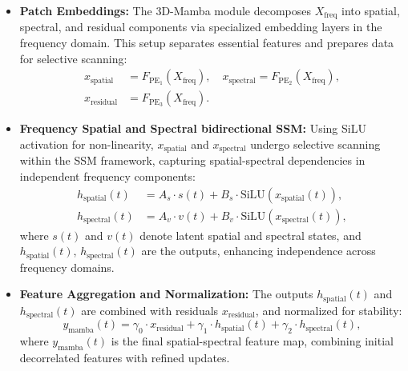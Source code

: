 \begin{itemize}
    \item \textbf{Patch Embeddings:} The 3D-Mamba module decomposes \( X_{\text{freq}} \) into spatial, spectral, and residual components via specialized embedding layers in the frequency domain. This setup separates essential features and prepares data for selective scanning:
    \begin{equation}
    \begin{aligned}
    x_{\text{spatial}} &= F_{\text{PE}_1}(X_{\text{freq}}), \quad x_{\text{spectral}} = F_{\text{PE}_2}(X_{\text{freq}}), \\
    x_{\text{residual}} &= F_{\text{PE}_3}(X_{\text{freq}}).
    \end{aligned}
    \end{equation}

    \item \textbf{Frequency Spatial and Spectral bidirectional SSM:} Using SiLU activation for non-linearity, \( x_{\text{spatial}} \) and \( x_{\text{spectral}} \) undergo selective scanning within the SSM framework, capturing spatial-spectral dependencies in independent frequency components:
        \begin{equation}
        \begin{aligned}
            h_{\text{spatial}}(t) &= A_s \cdot s(t) + B_s \cdot \text{SiLU}(x_{\text{spatial}}(t)), \\
            h_{\text{spectral}}(t) &= A_v \cdot v(t) + B_v \cdot \text{SiLU}(x_{\text{spectral}}(t)),
        \end{aligned}
        \end{equation}
        where \( s(t) \) and \( v(t) \) denote latent spatial and spectral states, and \( h_{\text{spatial}}(t) \), \( h_{\text{spectral}}(t) \) are the outputs, enhancing independence across frequency domains.

    \item \textbf{Feature Aggregation and Normalization:} The outputs \( h_{\text{spatial}}(t) \) and \( h_{\text{spectral}}(t) \) are combined with residuals \( x_{\text{residual}} \), and normalized for stability:
        \begin{equation}
        y_{\text{mamba}}(t) = \gamma_0 \cdot x_{\text{residual}} + \gamma_1 \cdot h_{\text{spatial}}(t) + \gamma_2 \cdot h_{\text{spectral}}(t),
        \end{equation}
        where \( y_{\text{mamba}}(t) \) is the final spatial-spectral feature map, combining initial decorrelated features with refined updates.
\end{itemize}

